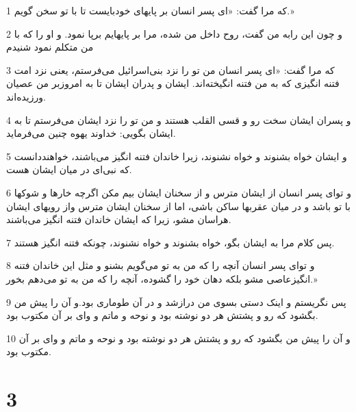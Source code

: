 \par 1 که مرا گفت: «ای پسر انسان بر پایهای خودبایست تا با تو سخن گویم.»
\par 2 و چون این رابه من گفت، روح داخل من شده، مرا بر پایهایم برپا نمود. و او را که با من متکلم نمود شنیدم
\par 3 که مرا گفت: «ای پسر انسان من تو را نزد بنی‌اسرائیل می‌فرستم، یعنی نزد امت فتنه انگیزی که به من فتنه انگیخته‌اند. ایشان و پدران ایشان تا به امروزبر من عصیان ورزیده‌اند.
\par 4 و پسران ایشان سخت رو و قسی القلب هستند و من تو را نزد ایشان می‌فرستم تا به ایشان بگویی: خداوند یهوه چنین می‌فرماید.
\par 5 و ایشان خواه بشنوند و خواه نشنوند، زیرا خاندان فتنه انگیز می‌باشند، خواهنددانست که نبی‌ای در میان ایشان هست.
\par 6 و تو‌ای پسر انسان از ایشان مترس و از سخنان ایشان بیم مکن اگرچه خارها و شوکها با تو باشد و در میان عقربها ساکن باشی، اما از سخنان ایشان مترس واز رویهای ایشان هراسان مشو، زیرا که ایشان خاندان فتنه انگیز می‌باشند.
\par 7 پس کلام مرا به ایشان بگو، خواه بشنوند و خواه نشنوند، چونکه فتنه انگیز هستند.
\par 8 و تو‌ای پسر انسان آنچه را که من به تو می‌گویم بشنو و مثل این خاندان فتنه انگیزعاصی مشو بلکه دهان خود را گشوده، آنچه را که من به تو می‌دهم بخور.»
\par 9 پس نگریستم و اینک دستی بسوی من درازشد و در آن طوماری بود.و آن را پیش من بگشود که رو و پشتش هر دو نوشته بود و نوحه و ماتم و وای بر آن مکتوب بود.
\par 10 و آن را پیش من بگشود که رو و پشتش هر دو نوشته بود و نوحه و ماتم و وای بر آن مکتوب بود.

\chapter{3}

